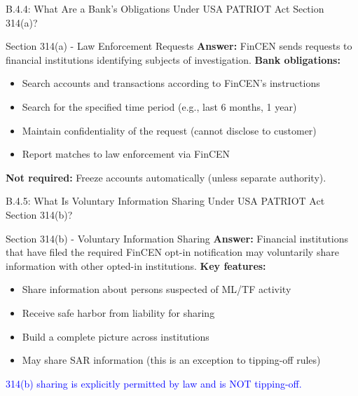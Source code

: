 \documentclass{beamer}
\begin{document}
	\begin{frame}{B.4.4: What Are a Bank's Obligations Under USA PATRIOT Act Section 314(a)?}
		\begin{block}{Section 314(a) - Law Enforcement Requests}
			\textbf{Answer:} FinCEN sends requests to financial institutions identifying subjects of investigation.
			\vspace{0.2cm}
			\textbf{Bank obligations:}
			\begin{itemize}
				\item Search accounts and transactions according to FinCEN's instructions
				\item Search for the specified time period (e.g., last 6 months, 1 year)
				\item Maintain confidentiality of the request (cannot disclose to customer)
				\item Report matches to law enforcement via FinCEN
			\end{itemize}
			\textbf{Not required:} Freeze accounts automatically (unless separate authority).
		\end{block}
	\end{frame}
	
	\begin{frame}{B.4.5: What Is Voluntary Information Sharing Under USA PATRIOT Act Section 314(b)?}
		\begin{block}{Section 314(b) - Voluntary Information Sharing}
			\textbf{Answer:} Financial institutions that have filed the required FinCEN opt-in notification may voluntarily share information with other opted-in institutions.
			\vspace{0.2cm}
			\textbf{Key features:}
			\begin{itemize}
				\item Share information about persons suspected of ML/TF activity
				\item Receive safe harbor from liability for sharing
				\item Build a complete picture across institutions
				\item May share SAR information (this is an exception to tipping-off rules)
			\end{itemize}
			\textcolor{blue}{314(b) sharing is explicitly permitted by law and is NOT tipping-off.}
		\end{block}
	\end{frame}
	
\end{document}
